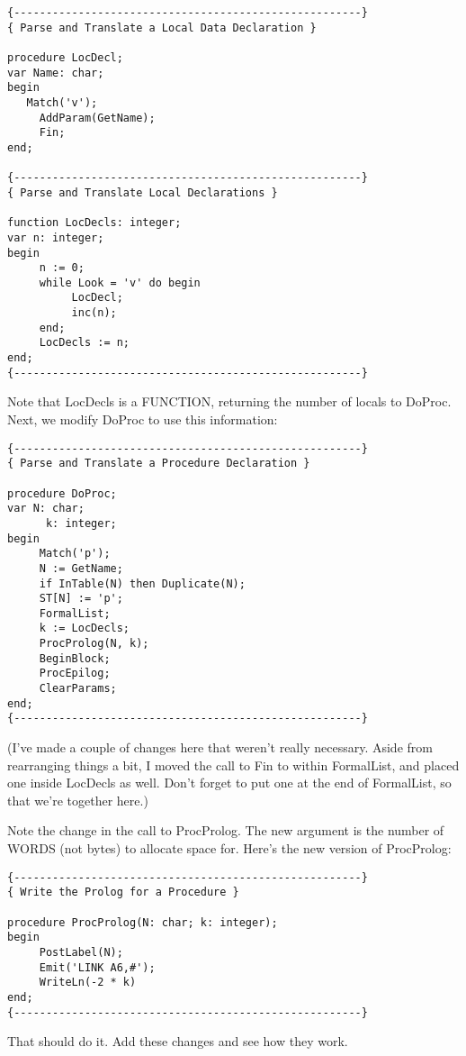 \begin{verbatim}
{------------------------------------------------------}
{ Parse and Translate a Local Data Declaration }

procedure LocDecl;
var Name: char;
begin
   Match('v');
     AddParam(GetName);
     Fin;
end;

{------------------------------------------------------}
{ Parse and Translate Local Declarations }

function LocDecls: integer;
var n: integer;
begin
     n := 0;
     while Look = 'v' do begin
          LocDecl;
          inc(n);
     end;
     LocDecls := n;
end;
{------------------------------------------------------}
\end{verbatim}

Note that LocDecls is a  FUNCTION, returning the number of locals to DoProc.
Next, we modify DoProc to use this information:

\begin{verbatim}
{------------------------------------------------------}
{ Parse and Translate a Procedure Declaration }

procedure DoProc;
var N: char;
      k: integer;
begin
     Match('p');
     N := GetName;
     if InTable(N) then Duplicate(N);
     ST[N] := 'p';
     FormalList;
     k := LocDecls;
     ProcProlog(N, k);
     BeginBlock;
     ProcEpilog;
     ClearParams;
end;
{------------------------------------------------------}
\end{verbatim}

(I've  made   a  couple  of  changes  here  that  weren't  really necessary. Aside from rearranging things a bit, I moved the call to  Fin  to  within FormalList, and placed one inside LocDecls as well. Don't forget to put one at the end of FormalList, so that we're together here.)

Note the change in the call  to  ProcProlog. The new argument is the number of WORDS (not bytes) to allocate space  for. Here's the new version of ProcProlog:

\begin{verbatim}
{------------------------------------------------------}
{ Write the Prolog for a Procedure }

procedure ProcProlog(N: char; k: integer);
begin
     PostLabel(N);
     Emit('LINK A6,#');
     WriteLn(-2 * k)
end;
{------------------------------------------------------}
\end{verbatim}

That should do it. Add these changes and see how they work.

